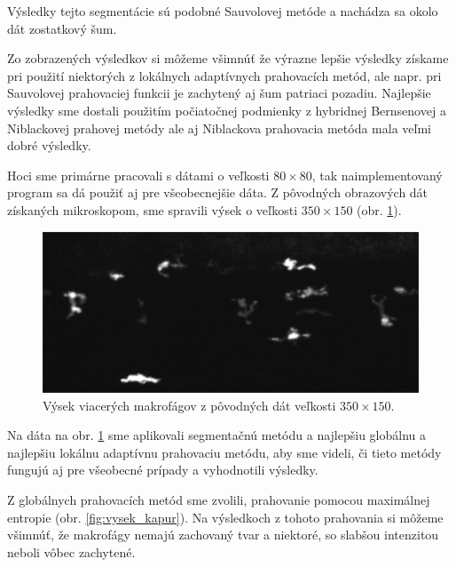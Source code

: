 \documentclass[a4paper,11pt,oneside]{article}%
\begin{document}
Výsledky tejto segmentácie sú podobné Sauvolovej metóde a nachádza sa okolo dát zostatkový šum.


Zo zobrazených výsledkov si môžeme všimnúť že výrazne lepšie výsledky získame pri použití niektorých z lokálnych adaptívnych prahovacích metód, ale napr. pri Sauvolovej prahovaciej funkcii je zachytený aj šum patriaci pozadiu. Najlepšie výsledky sme dostali použitím počiatočnej podmienky z hybridnej Bernsenovej a Niblackovej prahovej metódy ale aj Niblackova prahovacia metóda mala veľmi dobré výsledky. 

Hoci sme primárne pracovali s dátami o veľkosti $80\times80$, tak naimplementovaný program sa dá použiť aj pre všeobecnejšie dáta. Z pôvodných obrazových dát získaných mikroskopom, sme spravili výsek o veľkosti $350\times150$ (obr. \ref{fig:vysek}).

\begin{figure}[H]
 \begin{center} 
 \includegraphics[scale=0.50]{pics/vysekoD.png}
\caption{Výsek viacerých makrofágov z pôvodných dát veľkosti $350\times150$.}
\label{fig:vysek}
\end{center} 
\end{figure}

Na dáta na obr. \ref{fig:vysek} sme aplikovali segmentačnú metódu a najlepšiu globálnu a najlepšiu lokálnu adaptívnu prahovaciu metódu, aby sme videli, či tieto metódy fungujú aj pre všeobecné prípady a vyhodnotili výsledky. 

Z globálnych prahovacích metód sme zvolili, prahovanie pomocou maximálnej entropie (obr. \ref{fig:vysek_kapur}). Na výsledkoch z tohoto prahovania si môžeme všimnúť, že makrofágy nemajú zachovaný tvar a niektoré, so slabšou intenzitou neboli vôbec zachytené. 
\end{document}
